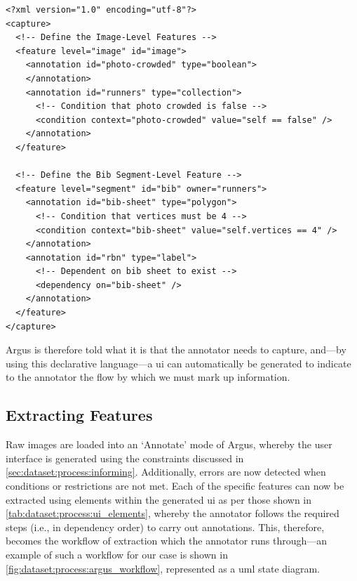 \begin{lstlisting}[language=ACL, label=lst:dataset:process:acl_sample, caption={[Sample Argus Constraint Language File Format] An \glsx{acl} file describing the image-level and $BibSheet$ segment-level features as represented in an \glsac{xml} schema.}]
<?xml version="1.0" encoding="utf-8"?>
<capture>
  <!-- Define the Image-Level Features -->
  <feature level="image" id="image">
    <annotation id="photo-crowded" type="boolean">
    </annotation>
    <annotation id="runners" type="collection">
      <!-- Condition that photo crowded is false -->
      <condition context="photo-crowded" value="self == false" />
    </annotation>
  </feature>
  
  <!-- Define the Bib Segment-Level Feature -->
  <feature level="segment" id="bib" owner="runners">
    <annotation id="bib-sheet" type="polygon">
      <!-- Condition that vertices must be 4 -->
      <condition context="bib-sheet" value="self.vertices == 4" />
    </annotation>
    <annotation id="rbn" type="label">
      <!-- Dependent on bib sheet to exist -->
      <dependency on="bib-sheet" />
    </annotation>
  </feature>
</capture>
\end{lstlisting}

Argus is therefore told what it is that the annotator needs to capture, and---by using this declarative language---a \gls{ui} can automatically be generated to indicate to the annotator the flow by which we must mark up information. 

\subsection{Extracting Features}
\label{sec:dataset:process:extracting}

Raw images are loaded into an `Annotate' mode of Argus, whereby the user interface is generated using the constraints discussed in \cref{sec:dataset:process:informing}. Additionally, errors are now detected when conditions or restrictions are not met. Each of the specific features can now be extracted using elements within the generated \gls{ui} as per those shown in \cref{tab:dataset:process:ui_elements}, whereby the annotator follows the required steps (i.e., in dependency order) to carry out annotations. This, therefore, becomes the workflow of extraction which the annotator runs through---an example of such a workflow for our case is shown in \cref{fig:dataset:process:argus_workflow}, represented as a \gls{uml} state diagram.

